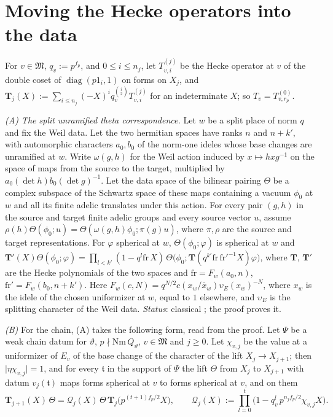\documentclass[reqno]{amsart}
\theoremstyle{plain}
\theoremstyle{definition}
\theoremstyle{remark}
\newcommand{\Qc}{\mathcal Q}
\newcommand{\Mk}{\mathfrak M}
\newcommand{\bT}{\mathbf T}
\begin{document}
\section{Moving the Hecke operators into the data}\label{sec:transfer}

For \(v \in \Mk\), \(q_v := p^{f_p}\), and \(0 \le i \le n_j\), let \(T^{(j)}_{v,i}\) be the Hecke operator at \(v\) of the double coset of \(\operatorname{diag}(p1_i, 1)\) on forms on \(X_j\), and \(\bT_j(X) := \sum_{i \le n_j} (-X)^i q_v^{\binom i2} T^{(j)}_{v,i}\) for an indeterminate \(X\); so \(T_v = T^{(0)}_{v,r_p}\).

\emph{(A) The split unramified theta correspondence.}  Let \(w\) be a split place of norm \(q\) and fix the Weil data.  Let the two hermitian spaces have ranks \(n\) and \(n+k'\), with automorphic characters \(a_0,b_0\) of the norm-one ideles whose base changes are unramified at \(w\).  Write \(\omega(g,h)\) for the Weil action induced by \(x\mapsto hxg^{-1}\) on the space of maps from the source to the target, multiplied by \(a_0(\det h)b_0(\det g)^{-1}\).  Let the data space of the bilinear pairing \(\Theta\) be a complex subspace of the Schwartz space of these maps containing a vacuum \(\phi_0\) at \(w\) and all its finite adelic translates under this action.  For every pair \((g,h)\) in the source and target finite adelic groups and every source vector \(u\), assume \(\rho(h)\Theta(\phi_0;u)=\Theta(\omega(g,h)\phi_0;\pi(g)u)\), where \(\pi,\rho\) are the source and target representations.  For \(\varphi\) spherical at \(w\), \(\Theta(\phi_0; \varphi)\) is spherical at \(w\) and \(\bT'(X)\Theta(\phi_0; \varphi) = \prod_{l<k'}(1 - q^l\mathrm{fr}\, X)\,\Theta\bigl(\phi_0; \bT(q^{k'}\mathrm{fr}\,\mathrm{fr}'^{-1}X)\varphi\bigr)\), where \(\bT\), \(\bT'\) are the Hecke polynomials of the two spaces and \(\mathrm{fr}=F_w(a_0,n)\), \(\mathrm{fr}'=F_w(b_0,n+k')\).  Here \(F_w(c,N)=q^{N/2}c(x_w/\bar x_w)\upsilon_E(x_w)^{-N}\), where \(x_w\) is the idele of the chosen uniformizer at \(w\), equal to \(1\) elsewhere, and \(\upsilon_E\) is the splitting character of the Weil data.  \emph{Status}: classical \cite{Ra, Ku}; the proof proves it.

\emph{(B)} For the chain, (A) takes the following form, read from the proof.  Let \(\Psi\) be a weak chain datum for \(\vartheta\), \(p \nmid \mathrm{Nm}\,Q_\vartheta\), \(v \in \Mk\) and \(j \ge 0\).  Let \(\chi_{v,j}\) be the value at a uniformizer of \(E_v\) of the base change of the character of the lift \(X_j \to X_{j+1}\); then \(\lvert\eta\chi_{v,j}\rvert = 1\), and for every \(\mathfrak t\) in the support of \(\Psi\) the lift \(\Theta\) from \(X_j\) to \(X_{j+1}\) with datum \(v_j(\mathfrak t)\) maps forms spherical at \(v\) to forms spherical at \(v\), and on them
\[
  \bT_{j+1}(X)\,\Theta = \Qc_j(X)\, \Theta\, \bT_j\bigl(p^{(t+1)f_p/2}X\bigr), \qquad
  \Qc_j(X) := \prod_{l=0}^{t}\bigl(1 - q_v^l\, p^{n_jf_p/2}\chi_{v,j} X\bigr) .
\]
\end{document}
